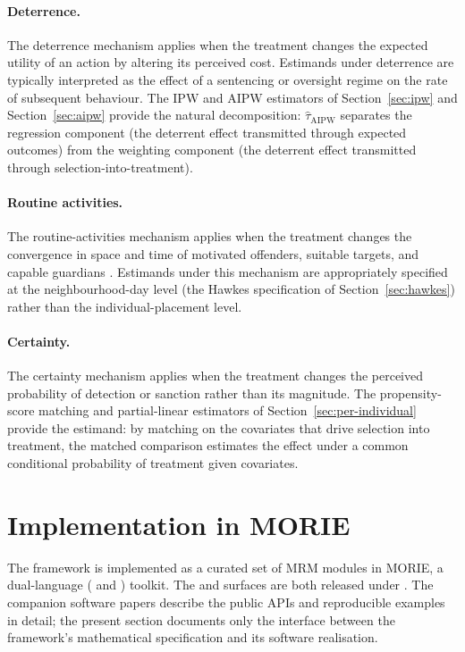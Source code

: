\documentclass[article,shortnames,nojss]{jss}
\begin{document}
\paragraph{Deterrence.}
The deterrence mechanism applies when the treatment changes the
expected utility of an action by altering its perceived cost.
Estimands under deterrence are typically interpreted as the effect
of a sentencing or oversight regime on the rate of subsequent
behaviour. The IPW and AIPW estimators of Section~\ref{sec:ipw}
and Section~\ref{sec:aipw} provide the natural decomposition:
$\hat{\tau}_{\mathrm{AIPW}}$ separates the regression component
(the deterrent effect transmitted through expected outcomes) from
the weighting component (the deterrent effect transmitted through
selection-into-treatment).

\paragraph{Routine activities.}
The routine-activities mechanism applies when the treatment
changes the convergence in space and time of motivated offenders,
suitable targets, and capable guardians \citep{CohenFelson1979}.
Estimands under this mechanism are appropriately specified at the
neighbourhood-day level (the Hawkes specification of
Section~\ref{sec:hawkes}) rather than the individual-placement
level.

\paragraph{Certainty.}
The certainty mechanism applies when the treatment changes the
perceived probability of detection or sanction rather than its
magnitude. The propensity-score matching and partial-linear
estimators of Section~\ref{sec:per-individual} provide the
estimand: by matching on the covariates that drive selection
into treatment, the matched comparison estimates the effect under
a common conditional probability of treatment given covariates.

\section{Implementation in MORIE}
\label{sec:morie}

The framework is implemented as a curated set of MRM modules in
MORIE, a dual-language ( and )
toolkit.  The  and  surfaces are both released
under .  The
companion software papers
\citep{Ruhela2026MorieR, Ruhela2026MoriePy} describe the public
APIs and reproducible examples in detail; the present section
documents only the interface between the framework's mathematical
specification and its software realisation.
\end{document}
